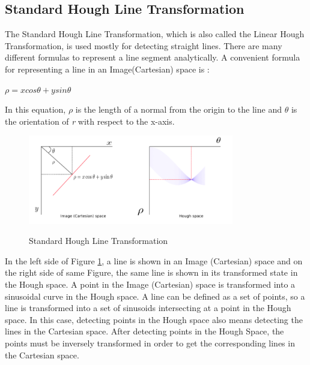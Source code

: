 \subsection{Standard Hough Line Transformation}\label{sec:Standard Hough Line Transformation}
%
The Standard Hough Line Transformation, which is also called the Linear Hough Transformation, is used mostly for detecting straight lines. There are many different formulas to represent a line segment analytically. A convenient formula for representing a line in an Image(Cartesian) space is :

  \begin{center}

$ \rho = x cos \theta + y sin \theta $

  \end{center}
  
In this equation, \textit{$ \rho $} is the length of a normal from the origin to the line and \textit{$ \theta $} is the orientation of \textit{r} with respect to the x-axis.
 
 
 \begin{figure}[H]
 \centering
  \includegraphics[width=0.8\textwidth]{./Bilder/Standard_Hough_Line_Transformation.png}\label{Standard_Hough_Line_Transformation_fig}
  \caption{Standard Hough Line Transformation\cite{Standard_Hough_Transformation}}
\end{figure}
 
 In the left side of Figure \ref{Standard_Hough_Line_Transformation_fig}, a line is shown in an Image (Cartesian) space and on the right side of same Figure, the same line is shown in its transformed state in the Hough space. A point in the Image (Cartesian) space is transformed into a sinusoidal curve in the Hough space. A line can be defined as a set of points, so a line is transformed into a set of sinusoids intersecting at a point in the Hough space. In this case, detecting points in the Hough space also means detecting the lines in the Cartesian space. After detecting points in the Hough Space, the points must be inversely transformed in order to get the corresponding lines in the Cartesian space.

